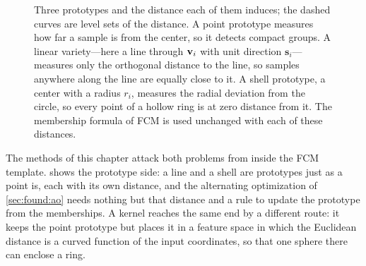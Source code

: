 \begin{figure}[htbp]
\caption[Three prototypes and the distance each of them induces; the dashed curves are level sets of the distance.]{Three prototypes and the distance each of them induces; the dashed curves are level sets of the distance. A point prototype measures how far a sample is from the center, so it detects compact groups. A linear variety---here a line through $\mathbf{v}_i$ with unit direction $\mathbf{s}_i$---measures only the orthogonal distance to the line, so samples anywhere along the line are equally close to it. A shell prototype, a center with a radius $r_i$, measures the radial deviation from the circle, so every point of a hollow ring is at zero distance from it. The membership formula of FCM is used unchanged with each of these distances.}
\label{fig:robust:prototypes}
\end{figure}

The methods of this chapter attack both problems from inside the FCM template.  shows the prototype side: a line and a shell are prototypes just as a point is, each with its own distance, and the alternating optimization of \cref{sec:found:ao} needs nothing but that distance and a rule to update the prototype from the memberships. A kernel reaches the same end by a different route: it keeps the point prototype but places it in a feature space in which the Euclidean distance is a curved function of the input coordinates, so that one sphere there can enclose a ring.

